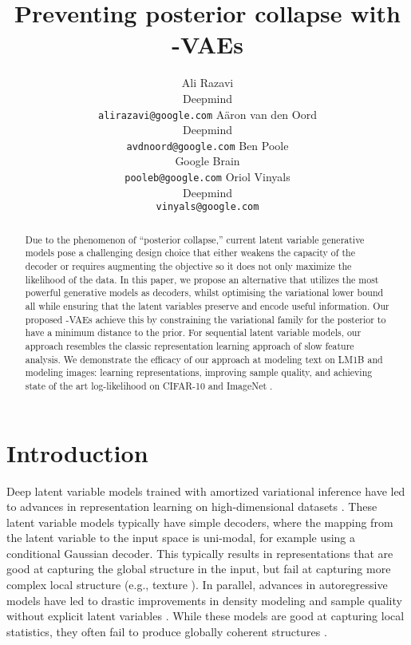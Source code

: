 \documentclass{article} \usepackage{iclr2019_conference,times}
\title{Preventing posterior collapse with -VAEs}
\author{Ali Razavi \\
  Deepmind \\
  \texttt{alirazavi@google.com}
  \And
  A\"aron van den Oord \\
  Deepmind \\
  \texttt{avdnoord@google.com}
  \And
  Ben Poole \\
  Google Brain \\
  \texttt{pooleb@google.com}
  \And
  Oriol Vinyals \\
  Deepmind \\
  \texttt{vinyals@google.com}
}
\begin{document}
\maketitle

\begin{abstract}
Due to the phenomenon of ``posterior collapse,'' current latent variable generative models pose a challenging design choice that either weakens the capacity of the decoder or requires augmenting the objective so it does not only maximize the likelihood of the data.
In this paper, we propose an alternative that utilizes the most powerful generative models as decoders, whilst optimising the variational lower bound all while ensuring that the latent variables preserve and encode useful information.
Our proposed -VAEs achieve this by constraining the variational family for the posterior to have a minimum distance to the prior.
For sequential latent variable models, our approach resembles the classic representation learning approach of slow feature analysis. We demonstrate the efficacy of our approach at modeling text on LM1B and modeling images: learning representations, improving sample quality, and achieving state of the art log-likelihood on CIFAR-10 and ImageNet .


\end{abstract}

\section{Introduction}
Deep latent variable models trained with amortized variational inference have led to advances in representation learning on high-dimensional datasets \citep{VAE, Rezende2014}. These latent variable models typically have simple decoders, where the mapping from the latent variable to the input space is uni-modal, for example using a conditional Gaussian decoder. This typically results in representations that are good at capturing the global structure in the input, but fail at capturing more complex local structure (e.g., texture \citep{vaegan}). In parallel, advances in autoregressive models have led to drastic improvements in density modeling and sample quality without explicit latent variables \citep{pixelcnn}. While these models are good at capturing local statistics, they often fail to produce globally coherent structures \citep{pixeliqn}.
\end{document}
